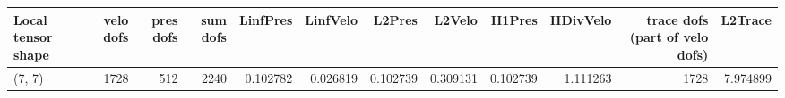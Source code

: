 \begin{tabular}{lrrrrrrrrrrr}
\toprule
Local tensor shape &  velo dofs &  pres dofs &  sum dofs &  LinfPres &  LinfVelo &   L2Pres &   L2Velo &   H1Pres &  HDivVelo &  trace dofs (part of velo dofs) &  L2Trace \\
\midrule
            (7, 7) &       1728 &        512 &      2240 &  0.102782 &  0.026819 & 0.102739 & 0.309131 & 0.102739 &  1.111263 &                            1728 & 7.974899 \\
\bottomrule
\end{tabular}

